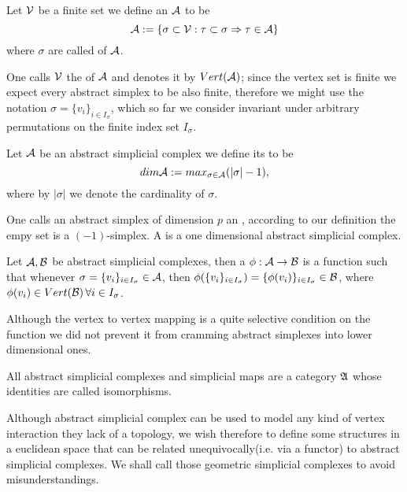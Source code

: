 \documentclass[../1.tex]{subfiles}
\begin{document}
    \begin{defn}
        Let $\mathcal{V}$ be a finite set we define an  $\mathcal{A}$ to be 
        \[\mathcal{A}:=\{ \sigma  \subset \mathcal{V} : \tau \subset \sigma \Rightarrow \tau \in \mathcal{A} \}\] 
        where $\sigma$ are called  of $\mathcal{A}$.
    \end{defn}
    
    One calls $\mathcal{V}$ the  of $\mathcal{A}$ and denotes it by $Vert(\mathcal{A})$; since the vertex
    set is finite we expect every abstract simplex to be also finite, therefore we might use the notation $\sigma = \{ v_i \}_{i \in I_\sigma}$,
    which so far we consider invariant under arbitrary permutations on the finite index set $I_\sigma$.

    \begin{defn}
        Let $\mathcal{A}$ be an abstract simplicial complex we define its  to be
        \[ dim \mathcal{A} := max_{\sigma \in \mathcal{A}}(|\sigma|-1), \]
        where by $|\sigma|$ we denote the cardinality of $\sigma$.
    \end{defn}

    One calls an abstract simplex of dimension $p$ an , according to our
    definition the empy set is a $(-1)$-simplex. A  is a one dimensional abstract simplicial complex.

    \begin{defn}
        Let $\mathcal{A},\mathcal{B}$ be abstract simplicial complexes, then a  $\phi : \mathcal{A} \to \mathcal{B}$ is a function 
        such that whenever $\sigma = \{v_i\}_{i \in I_\sigma} \in \mathcal{A}$, then $\phi(\{v_i\}_{i \in I_\sigma}) = \{\phi(v_i)\}_{i \in I_\sigma} \in \mathcal{B}$,
        where $\phi(v_i) \in Vert(\mathcal{B}) \, \forall i \in I_\sigma$.
    \end{defn}

    Although the vertex to vertex mapping is a quite selective condition on the function we did not prevent it from cramming
    abstract simplexes into lower dimensional ones.

    \begin{thm}
        All abstract simplicial complexes and simplicial maps are a category $\mathfrak{A}$ whose identities are called isomorphisms.
    \end{thm}

    Although abstract simplicial complex can be used to model any kind of vertex interaction they lack of a topology, we wish
    therefore to define some structures in a euclidean space that can be related unequivocally(i.e. via a functor) to abstract simplicial complexes.
    We shall call those geometric simplicial complexes to avoid misunderstandings.
        
\end{document}
